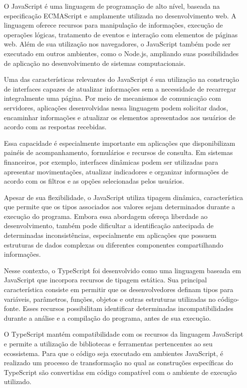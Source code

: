 O JavaScript é uma linguagem de programação de alto nível, baseada na especificação ECMAScript e amplamente utilizada no desenvolvimento web. A linguagem oferece recursos para manipulação de informações, execução de operações lógicas, tratamento de eventos e interação com elementos de páginas web. Além de sua utilização nos navegadores, o JavaScript também pode ser executado em outros ambientes, como o Node.js, ampliando suas possibilidades de aplicação no desenvolvimento de sistemas computacionais.

Uma das características relevantes do JavaScript é sua utilização na construção de interfaces capazes de atualizar informações sem a necessidade de recarregar integralmente uma página. Por meio de mecanismos de comunicação com servidores, aplicações desenvolvidas nessa linguagem podem solicitar dados, encaminhar informações e atualizar os elementos apresentados aos usuários de acordo com as respostas recebidas.

Essa capacidade é especialmente importante em aplicações que disponibilizam painéis de acompanhamento, formulários e recursos de consulta. Em sistemas financeiros, por exemplo, interfaces dinâmicas podem ser utilizadas para apresentar movimentações, atualizar indicadores e organizar informações de acordo com os filtros e as opções selecionadas pelos usuários.

Apesar de sua flexibilidade, o JavaScript utiliza tipagem dinâmica, característica que permite que os tipos associados aos valores sejam determinados durante a execução do programa. Embora essa abordagem ofereça liberdade ao desenvolvimento, também pode dificultar a identificação antecipada de determinadas inconsistências, especialmente em aplicações que possuem estruturas de dados complexas ou diferentes componentes compartilhando informações.

Nesse contexto, o TypeScript foi desenvolvido como uma linguagem baseada em JavaScript que incorpora recursos de tipagem estática. Sua principal característica consiste em permitir que os desenvolvedores definam tipos para variáveis, parâmetros, funções, objetos e outras estruturas utilizadas no código-fonte. Esses recursos possibilitam identificar determinadas incompatibilidades durante a análise e a compilação do programa, antes de sua execução.

O TypeScript mantém compatibilidade com os recursos da linguagem JavaScript e permite a utilização de bibliotecas e ferramentas pertencentes ao seu ecossistema. Para que o código seja executado em ambientes JavaScript, é realizado um processo de transformação no qual as construções específicas do TypeScript são convertidas em código compatível com o ambiente de execução utilizado.

